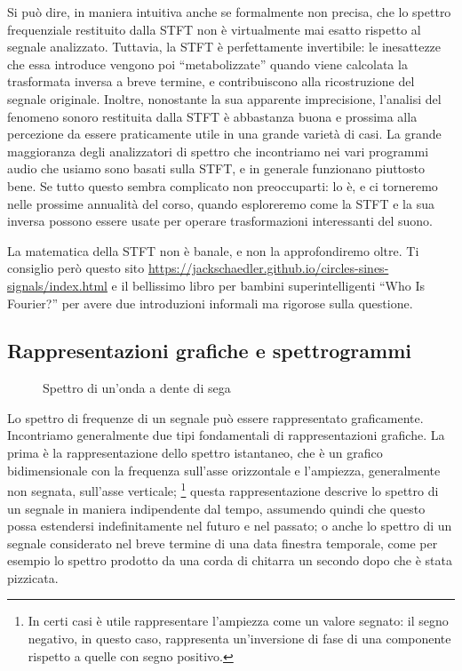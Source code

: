 Si può dire, in maniera intuitiva anche se formalmente non precisa, che lo spettro frequenziale restituito dalla STFT non è virtualmente mai esatto rispetto al segnale analizzato. Tuttavia, la STFT è perfettamente invertibile: le inesattezze che essa introduce vengono poi ``metabolizzate'' quando viene calcolata la trasformata inversa a breve termine, e contribuiscono alla ricostruzione del segnale originale. Inoltre, nonostante la sua apparente imprecisione, l'analisi del fenomeno sonoro restituita dalla STFT è abbastanza buona e prossima alla percezione da essere praticamente utile in una grande varietà di casi. La grande maggioranza degli analizzatori di spettro che incontriamo nei vari programmi audio che usiamo sono basati sulla STFT, e in generale funzionano piuttosto bene. Se tutto questo sembra complicato non preoccuparti: lo è, e ci torneremo nelle prossime annualità del corso, quando esploreremo come la STFT e la sua inversa possono essere usate per operare trasformazioni interessanti del suono.

La matematica della STFT non è banale, e non la approfondiremo oltre. Ti consiglio però questo sito \url{
https://jackschaedler.github.io/circles-sines-signals/index.html} e il bellissimo libro per bambini superintelligenti ``Who Is Fourier?'' per avere due introduzioni informali ma rigorose sulla questione.

\subsection{Rappresentazioni grafiche e spettrogrammi}

\begin{figure}
    \begin{center}
       \scalebox{0.6} {}
    \end{center}
    \caption{Spettro di un'onda a dente di sega}
\end{figure}

Lo spettro di frequenze di un segnale può essere rappresentato graficamente. Incontriamo generalmente due tipi fondamentali di rappresentazioni grafiche. La prima è la rappresentazione dello spettro istantaneo, che è un grafico bidimensionale con la frequenza sull'asse orizzontale e l'ampiezza, generalmente non segnata, sull'asse verticale;%
\footnote{In certi casi è utile rappresentare l'ampiezza come un valore segnato: il segno negativo, in questo caso, rappresenta un'inversione di fase di una componente rispetto a quelle con segno positivo.}
questa rappresentazione descrive lo spettro di un segnale in maniera indipendente dal tempo, assumendo quindi che questo possa estendersi indefinitamente nel futuro e nel passato; o anche lo spettro di un segnale considerato nel breve termine di una data finestra temporale, come per esempio lo spettro prodotto da una corda di chitarra un secondo dopo che è stata pizzicata.

